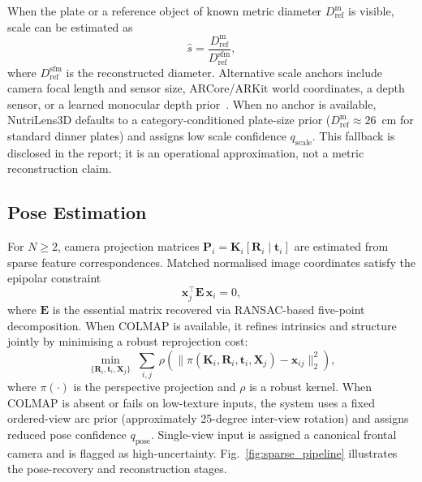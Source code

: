 \documentclass[conference]{IEEEtran}
\begin{document}
When the plate or a reference object of known metric diameter
$D^\text{m}_\text{ref}$ is visible, scale can be estimated as
\begin{equation}
    \hat{s} = \frac{D^\text{m}_\text{ref}}{D^\text{sfm}_\text{ref}},
    \label{eq:scaleest}
\end{equation}
where $D^\text{sfm}_\text{ref}$ is the reconstructed diameter. Alternative
scale anchors include camera focal length and sensor size, ARCore/ARKit world
coordinates, a depth sensor, or a learned monocular depth
prior~\cite{eigen2014depth, godard2017unsupervised}. When no anchor is
available, NutriLens3D defaults to a category-conditioned plate-size prior
($D^\text{m}_\text{ref} \approx 26$~cm for standard dinner plates) and
assigns low scale confidence $q_\text{scale}$. This fallback is disclosed in
the report; it is an operational approximation, not a metric reconstruction claim.

\subsection{Pose Estimation}

For $N \geq 2$, camera projection matrices
$\mathbf{P}_i = \mathbf{K}_i[\mathbf{R}_i \mid \mathbf{t}_i]$
are estimated from sparse feature correspondences. Matched normalised image
coordinates satisfy the epipolar constraint
\begin{equation}
    \mathbf{x}_j^\top \mathbf{E}\, \mathbf{x}_i = 0,
    \label{eq:epipolar}
\end{equation}
where $\mathbf{E}$ is the essential matrix recovered via RANSAC-based
five-point decomposition. When COLMAP is available, it refines intrinsics
and structure jointly by minimising a robust reprojection cost:
\begin{equation}
    \min_{\{\mathbf{R}_i,\mathbf{t}_i,\mathbf{X}_j\}}\;
    \sum_{i,j}\, \rho\!\left(\bigl\|
        \pi(\mathbf{K}_i,\mathbf{R}_i,\mathbf{t}_i,\mathbf{X}_j) - \mathbf{x}_{ij}
    \bigr\|_2^2\right),
    \label{eq:bundle}
\end{equation}
where $\pi(\cdot)$ is the perspective projection and $\rho$ is a robust
kernel. When COLMAP is absent or fails on low-texture inputs, the system
uses a fixed ordered-view arc prior (approximately 25-degree inter-view
rotation) and assigns reduced pose confidence $q_\text{pose}$.
Single-view input is assigned a canonical frontal camera and is flagged
as high-uncertainty. Fig.~\ref{fig:sparse_pipeline} illustrates the
pose-recovery and reconstruction stages.
\end{document}
